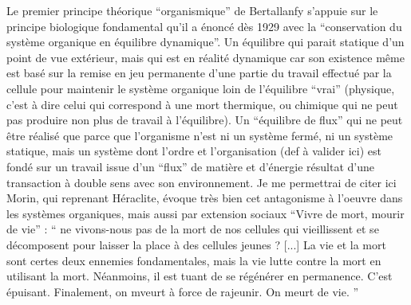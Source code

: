 Le premier principe théorique \enquote{organismique} de Bertallanfy s'appuie sur le principe biologique fondamental qu'il a énoncé dès 1929 avec la \enquote{conservation du système organique en équilibre dynamique}. Un équilibre qui parait statique d'un point de vue extérieur, mais qui est en réalité dynamique car son existence même est basé sur la remise en jeu permanente d'une partie du travail effectué par la cellule pour maintenir le système organique loin de l'équilibre \enquote{vrai} (physique, c'est à dire celui qui correspond à une mort thermique, ou chimique qui ne peut pas produire non plus de travail à l'équilibre). Un \enquote{équilibre de flux} qui ne peut être réalisé que parce que l'organisme n'est ni un système fermé, ni un système statique, mais un système dont l'ordre et l'organisation (def à valider ici) est fondé sur un travail issue d'un \enquote{flux} de matière et d'énergie résultat d'une transaction à double sens avec son environnement. \autocite[472]{Pouvreau2013} Je me permettrai de citer ici Morin, qui reprenant Héraclite, évoque très bien cet antagonisme à l'oeuvre dans les systèmes organiques, mais aussi par extension sociaux \enquote{Vivre de mort, mourir de vie} : \enquote{ ne vivons-nous pas de la mort de nos cellules qui vieillissent et se décomposent pour laisser la place à des cellules jeunes ? [...] La vie et la mort sont certes deux ennemies fondamentales, mais la vie lutte contre la mort en utilisant la mort. Néanmoins, il est tuant de se régénérer en permanence. C’est épuisant. Finalement, on mveurt à force de rajeunir. On meurt de vie. } \autocite{MorinXX}

